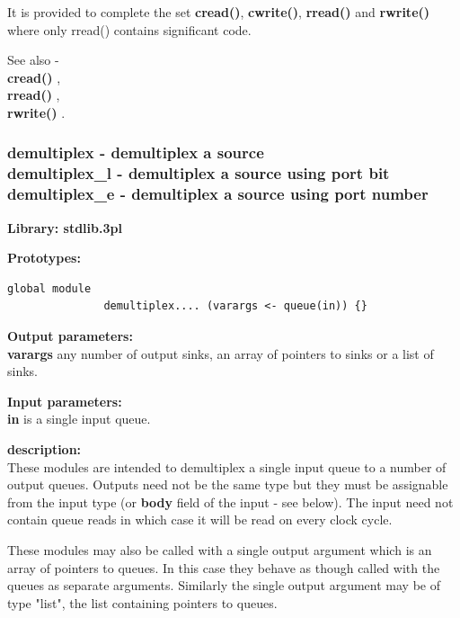             It is provided to complete the set {\bf cread()}, {\bf cwrite()},
            {\bf rread()} and {\bf rwrite()} where only rread() contains
            significant code.
            
            See also - \\
            {\bf cread()} , \\
            {\bf rread()} , \\
            {\bf rwrite()} .





        \subsubsection{demultiplex - demultiplex a source\\
                    demultiplex\_l - demultiplex a source using port bit\\
                    demultiplex\_e - demultiplex a source using port number}\label{sec:lmdemultiplex}

            {\bf Library: stdlib.3pl}

            {\bf Prototypes:} \\
            \vsp
            \begin{lstlisting}[gobble=12, language=threepl]
               global module
               demultiplex.... (varargs <- queue(in)) {}
            \end{lstlisting}

            {\bf Output parameters:} \\
            {\bf varargs} any number of output sinks, an array of pointers
            to sinks or a list of sinks.

            {\bf Input parameters:} \\
            {\bf in} is a single input queue.

            {\bf description:} \\
            These modules are intended to demultiplex a single input queue to a
            number of output queues. Outputs need not be the same type but they must
            be assignable from the input type (or {\bf body} field of the input -
            see below). The input need not contain queue reads in which case it will
            be read on every clock cycle.

            These modules may also be called with a single output argument which
            is an array of pointers to queues. In this case they behave as though
            called with the queues as separate arguments. Similarly the single
            output argument may be of type "list", the list containing pointers
            to queues.

